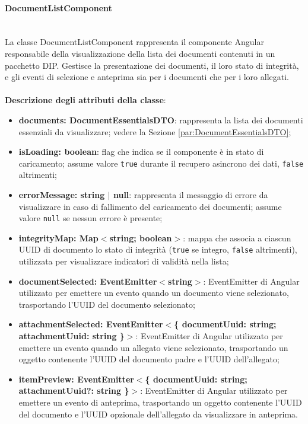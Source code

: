 \documentclass[a4paper,12pt]{article}
\begin{document}
{{{{                \paragraph{DocumentListComponent}\label{par:DocumentListComponent}\mbox{}\\
                La classe DocumentListComponent rappresenta il componente Angular responsabile della visualizzazione della lista dei documenti contenuti in un pacchetto DIP. Gestisce la presentazione dei documenti, il loro stato di integrità, e gli eventi di selezione e anteprima sia per i documenti che per i loro allegati.\\
                \\
                \textbf{Descrizione degli attributi della classe}:
                \begin{itemize}
                    \item \textbf{documents: DocumentEssentialsDTO}: rappresenta la lista dei documenti essenziali da visualizzare; vedere la Sezione \ref{par:DocumentEssentialsDTO};
                    \item \textbf{isLoading: boolean}: flag che indica se il componente è in stato di caricamento; assume valore \texttt{true} durante il recupero asincrono dei dati, \texttt{false} altrimenti;
                    \item \textbf{errorMessage: string $|$ null}: rappresenta il messaggio di errore da visualizzare in caso di fallimento del caricamento dei documenti; assume valore \texttt{null} se nessun errore è presente;
                    \item \textbf{integrityMap: Map$<$string; boolean$>$}: mappa che associa a ciascun UUID di documento lo stato di integrità (\texttt{true} se integro, \texttt{false} altrimenti), utilizzata per visualizzare indicatori di validità nella lista;
                    \item \textbf{documentSelected: EventEmitter$<$string$>$}: EventEmitter di Angular utilizzato per emettere un evento quando un documento viene selezionato, trasportando l'UUID del documento selezionato;
                    \item \textbf{attachmentSelected: EventEmitter$<$\{ documentUuid: string; attachmentUuid: string \}$>$}: EventEmitter di Angular utilizzato per emettere un evento quando un allegato viene selezionato, trasportando un oggetto contenente l'UUID del documento padre e l'UUID dell'allegato;
                    \item \textbf{itemPreview: EventEmitter$<$\{ documentUuid: string; attachmentUuid?: string \}$>$}: EventEmitter di Angular utilizzato per emettere un evento di anteprima, trasportando un oggetto contenente l'UUID del documento e l'UUID opzionale dell'allegato da visualizzare in anteprima.
                \end{itemize}
                
}}}}
\end{document}
